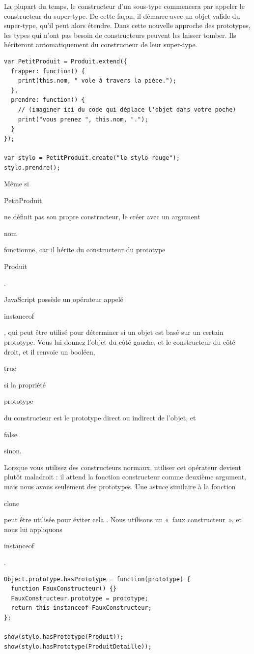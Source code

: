 \documentclass{FramateX}
\renewcommand{\texttt}[1]{\begin{sffamily}{#1}\end{sffamily}}
\begin{document}
\begin{center}\end{center}

La plupart du temps, le constructeur d'un sous-type commencera par
appeler le constructeur du super-type. De cette façon, il démarre avec
un objet valide du super-type, qu'il peut alors étendre. Dans cette
nouvelle approche des prototypes, les types qui n'ont pas besoin de
constructeurs peuvent les laisser tomber. Ils hériteront automatiquement
du constructeur de leur super-type.

\begin{lstlisting}
var PetitProduit = Produit.extend({
  frapper: function() {
    print(this.nom, " vole à travers la pièce.");
  },
  prendre: function() {
    // (imaginer ici du code qui déplace l'objet dans votre poche)
    print("vous prenez ", this.nom, ".");
  }
});

var stylo = PetitProduit.create("le stylo rouge");
stylo.prendre();
\end{lstlisting}
Même si \texttt{PetitProduit} ne définit pas son propre constructeur, le
créer avec un argument \texttt{nom} fonctionne, car il hérite du
constructeur du prototype \texttt{Produit}.

\begin{center}\end{center}

JavaScript possède un opérateur appelé \texttt{instanceof}, qui peut
être utilisé pour déterminer si un objet est basé sur un certain
prototype. Vous lui donnez l'objet du côté gauche, et le constructeur du
côté droit, et il renvoie un booléen, \texttt{true} si la propriété
\texttt{prototype} du constructeur est le prototype direct ou indirect
de l'objet, et \texttt{false} sinon.

Lorsque vous utilisez des constructeurs normaux, utiliser cet opérateur
devient plutôt maladroit : il attend la fonction constructeur comme
deuxième argument, mais nous avons seulement des prototypes. Une astuce
similaire à la fonction \texttt{clone} peut être utilisée pour éviter
cela . Nous utilisons un «~faux constructeur~», et nous lui appliquons
\texttt{instanceof}.

\begin{lstlisting}
Object.prototype.hasPrototype = function(prototype) {
  function FauxConstructeur() {}
  FauxConstructeur.prototype = prototype;
  return this instanceof FauxConstructeur;
};

show(stylo.hasPrototype(Produit));
show(stylo.hasPrototype(ProduitDetaille));
\end{lstlisting}
\begin{center}\end{center}
\end{document}
